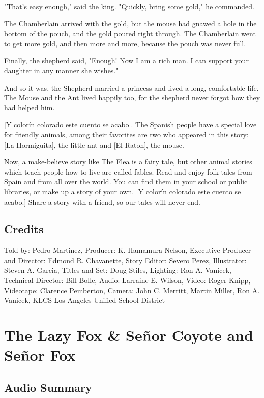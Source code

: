 "That's easy enough," said the king. "Quickly, bring some gold," he commanded.

The Chamberlain arrived with the gold, but the mouse had gnawed a hole in the bottom of the pouch, and the gold poured right through. The Chamberlain went to get more gold, and then more and more, because the pouch was never full.

Finally, the shepherd said, "Enough! Now I am a rich man. I can support your daughter in any manner she wishes."

And so it was, the Shepherd married a princess and lived a long, comfortable life. The Mouse and the Ant lived happily too, for the shepherd never forgot how they had helped him.

    [Y colorín colorado este cuento se acabo]. The Spanish people have a special love for friendly animals, among their favorites are two who appeared in this story: [La Hormiguita], the little ant and [El Raton], the mouse.

Now, a make-believe story like The Flea is a fairy tale, but other animal stories which teach people how to live are called fables. Read and enjoy folk tales from Spain and from all over the world. You can find them in your school or public libraries, or make up a story of your own. [Y colorín colorado este cuento se acabo.] Share a story with a friend, so our tales will never end.

\subsection{Credits}

Told by: Pedro Martinez,
Producer: K. Hamamura Nelson,
Executive Producer and Director: Edmond R. Chavanette,
Story Editor: Severo Perez,
Illustrator: Steven A. Garcia,
Titles and Set: Doug Stiles,
Lighting: Ron A. Vanicek,
Technical Director: Bill Bolle,
Audio: Larraine E. Wilson,
Video: Roger Knipp,
Videotape: Clarence Pemberton,
Camera: John C. Merritt, Martin Miller, Ron A. Vanicek,
KLCS Los Angeles Unified School District

\section{The Lazy Fox \& Señor Coyote and Señor Fox}

\subsection{Audio Summary}

